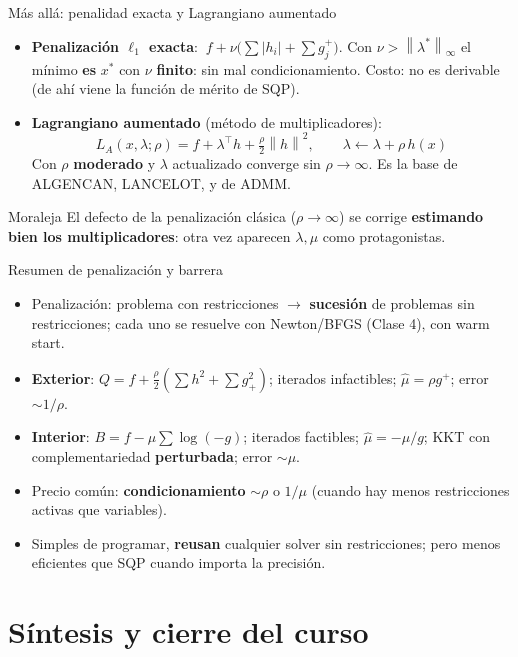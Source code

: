 \documentclass[aspectratio=169]{beamer}
\newcommand{\norm}[1]{\left\lVert #1\right\rVert}
\begin{document}
\begin{frame}{Más allá: penalidad exacta y Lagrangiano aumentado}
  \small
  \begin{itemize}
    \item \textbf{Penalización $\ell_1$ exacta}: $\ f+\nu\bigl(\sum|h_i|+\sum g_j^+\bigr)$. Con $\nu>\norm{\lambda^\ast}_\infty$ el mínimo \textbf{es} $x^\ast$ con $\nu$ \textbf{finito}: sin mal condicionamiento. Costo: no es derivable (de ahí viene la función de mérito de SQP).
    \item \textbf{Lagrangiano aumentado} (método de multiplicadores):
    \[ L_A(x,\lambda;\rho)=f+\lambda^\top h+\tfrac\rho2\norm{h}^2,\qquad \lambda\leftarrow\lambda+\rho\,h(x) \]
    Con $\rho$ \textbf{moderado} y $\lambda$ actualizado converge sin $\rho\to\infty$. Es la base de ALGENCAN, LANCELOT, y de ADMM.
  \end{itemize}
  \begin{exampleblock}{Moraleja}
    El defecto de la penalización clásica ($\rho\to\infty$) se corrige \textbf{estimando bien los multiplicadores}: otra vez aparecen $\lambda,\mu$ como protagonistas.
  \end{exampleblock}
\end{frame}

\begin{frame}{Resumen de penalización y barrera}
  \begin{itemize}
    \item Penalización: problema con restricciones $\to$ \textbf{sucesión} de problemas sin restricciones; cada uno se resuelve con Newton/BFGS (Clase 4), con warm start.
    \item \textbf{Exterior}: $Q=f+\tfrac\rho2(\sum h^2+\sum g_+^2)$; iterados infactibles; $\hat\mu=\rho g^+$; error $\sim1/\rho$.
    \item \textbf{Interior}: $B=f-\mu\sum\log(-g)$; iterados factibles; $\hat\mu=-\mu/g$; KKT con complementariedad \textbf{perturbada}; error $\sim\mu$.
    \item Precio común: \textbf{condicionamiento} $\sim\rho$ o $1/\mu$ (cuando hay menos restricciones activas que variables).
    \item Simples de programar, \textbf{reusan} cualquier solver sin restricciones; pero menos eficientes que SQP cuando importa la precisión.
  \end{itemize}
\end{frame}
\section{Síntesis y cierre del curso}
\end{document}

